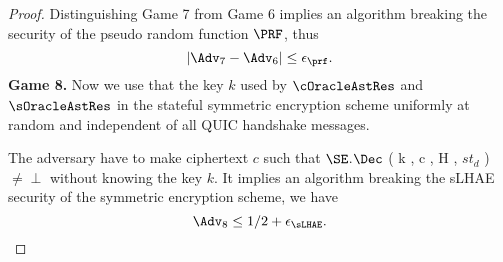 \begin{proof}
 Distinguishing Game 7 from Game 6 implies an algorithm breaking the security of the pseudo random function $\PRF$, thus
 \begin{equation}
  |\Adv_7 - \Adv_6| \leq \epsilon_{\prf}.
 \end{equation}%
%
%
 \textbf{Game 8.} Now we use that the key $k$ used by $\cOracleAstRes$ and $\sOracleAstRes$ in the stateful symmetric encryption scheme uniformly at random and independent of all QUIC handshake messages.

 The adversary have to make ciphertext $c$ such that $\SE$.$\Dec$ ( k , c , H , $st_d$ ) $\neq \perp$ without knowing the key $k$. It implies an algorithm breaking the sLHAE security of the symmetric encryption scheme, we have
 \begin{equation}
  \Adv_8 \leq 1/2 + \epsilon_{\sLHAE}.
 \end{equation}%
\end{proof}